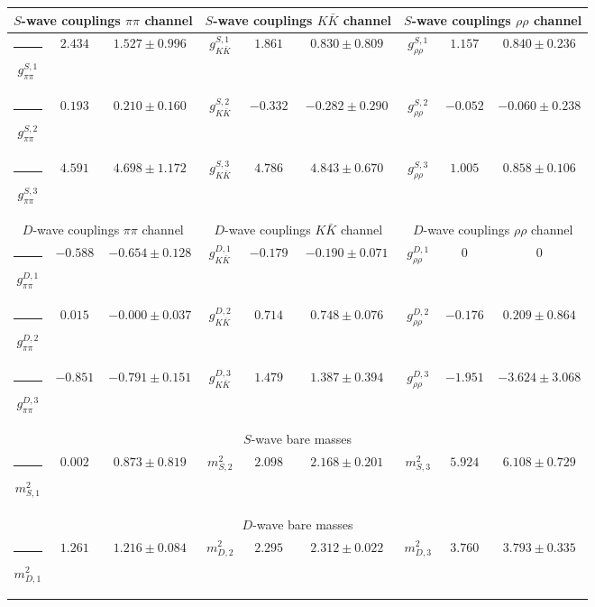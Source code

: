 \begin{table}[h]
\begin{ruledtabular}
\begin{tabular}{c c c c c c c c c}
\multicolumn{3}{c}{$S$-wave couplings $\pi \pi$ channel}  & \multicolumn{3}{c}{$S$-wave couplings $K  \bar K$ channel} & \multicolumn{3}{c}{$S$-wave couplings $\rho\rho$ channel} \\ \hline
\rule[-0.2cm]{-0.1cm}{.55cm} $g^{S,1}_{\pi\pi}$ & $2.434$ & $1.527 \pm 0.996$ & $g^{S,1}_{K\bar K}$ & $1.861$ & $0.830 \pm 0.809$ & $g^{S,1}_{\rho\rho}$ & $1.157$ & $0.840 \pm 0.236$ \\
\rule[-0.2cm]{-0.1cm}{.55cm} $g^{S,2}_{\pi\pi}$ & $0.193$ & $0.210 \pm 0.160$ & $g^{S,2}_{K\bar K}$ & $-0.332$ & $-0.282 \pm 0.290$ & $g^{S,2}_{\rho\rho}$ & $-0.052$ & $-0.060 \pm 0.238$ \\
\rule[-0.2cm]{-0.1cm}{.55cm} $g^{S,3}_{\pi\pi}$ & $4.591$ & $4.698 \pm 1.172$ & $g^{S,3}_{K\bar K}$ & $4.786$ & $4.843 \pm 0.670$ & $g^{S,3}_{\rho\rho}$ & $1.005$ & $0.858 \pm 0.106$ \\
\hline 
\multicolumn{3}{c}{$D$-wave couplings $\pi \pi$ channel}  & \multicolumn{3}{c}{$D$-wave couplings $K  \bar K$ channel} & \multicolumn{3}{c}{$D$-wave couplings $\rho\rho$ channel} \\ \hline
\rule[-0.2cm]{-0.1cm}{.55cm} $g^{D,1}_{\pi\pi}$ & $-0.588$ & $-0.654 \pm 0.128$ & $g^{D,1}_{K\bar K}$ & $-0.179$ & $-0.190 \pm 0.071$ & $g^{D,1}_{\rho\rho}$ & $0$ & $0$ \\
\rule[-0.2cm]{-0.1cm}{.55cm} $g^{D,2}_{\pi\pi}$ & $0.015$ & $-0.000 \pm 0.037$ & $g^{D,2}_{K\bar K}$ & $0.714$ & $0.748 \pm 0.076$ & $g^{D,2}_{\rho\rho}$ & $-0.176$ & $0.209 \pm 0.864$ \\
\rule[-0.2cm]{-0.1cm}{.55cm} $g^{D,3}_{\pi\pi}$ & $-0.851$ & $-0.791 \pm 0.151$ & $g^{D,3}_{K\bar K}$ & $1.479$ & $1.387 \pm 0.394$ & $g^{D,3}_{\rho\rho}$ & $-1.951$ & $-3.624 \pm 3.068$ \\
\hline 
\multicolumn{9}{c}{$S$-wave bare masses}   \\ \hline
\rule[-0.2cm]{-0.1cm}{.55cm} $m^2_{S,1}$ & $0.002$ & $0.873 \pm 0.819$ & $m^2_{S,2}$ & $2.098$ & $2.168 \pm 0.201$ & $m^2_{S,3}$ & $5.924$ & $6.108 \pm 0.729$ \\
\hline 
\multicolumn{9}{c}{$D$-wave bare masses}   \\ \hline
\rule[-0.2cm]{-0.1cm}{.55cm} $m^2_{D,1}$ & $1.261$ & $1.216 \pm 0.084$ & $m^2_{D,2}$ & $2.295$ & $2.312 \pm 0.022$ & $m^2_{D,3}$ & $3.760$ & $3.793 \pm 0.335$ \\

\end{tabular}
\end{ruledtabular}
\end{table}
